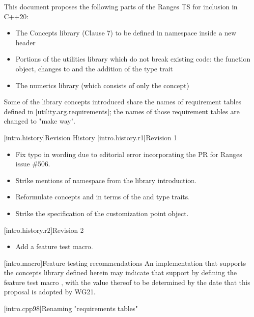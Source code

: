 This document proposes the following parts of the Ranges TS for inclusion in C++20:
\begin{itemize}
\item The Concepts library (Clause 7) to be defined in namespace  inside
  a new  header
\item Portions of the utilities library which do not break existing code: the
   function object, changes to   and the
  addition of the  type trait
\item The numerics library (which consists of only the
   concept)
\end{itemize}
Some of the library concepts introduced share the names of requirement tables
defined in [utility.arg.requirements]; the names of those requirement tables are
changed to "make way".

[intro.history]{Revision History}
[intro.history.r1]{Revision 1}
\begin{itemize}
\item Fix typo in  wording due to editorial error
  incorporating the PR for Ranges issue \#506.
\item Strike mentions of namespace  from the library introduction.
\item Reformulate concepts  and  in terms
  of the  and  type traits.
\item Strike the specification of the  customization point object.
\end{itemize}
[intro.history.r2]{Revision 2}
\begin{itemize}
\item Add a feature test macro.
\end{itemize}

[intro.macro]{Feature testing recommendations}
An implementation that supports the concepts library defined herein may indicate
that support by defining the feature test macro , with
the value thereof to be determined by the date that this proposal is adopted by
WG21.

[intro.cpp98]{Renaming "requirements tables"}

